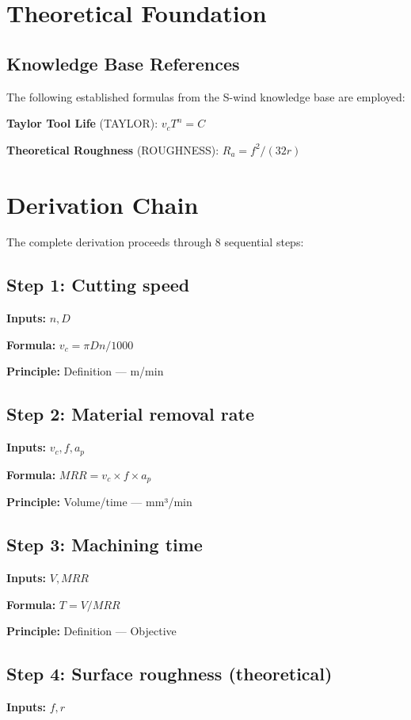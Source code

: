 \documentclass[11pt,twocolumn]{article}
\begin{document}
\section{Theoretical Foundation}

\subsection{Knowledge Base References}
The following established formulas from the S-wind knowledge base are employed:

\textbf{Taylor Tool Life} (TAYLOR): $v_c T^n = C$ \cite{Taylor}

\textbf{Theoretical Roughness} (ROUGHNESS): $R_a = f^2/(32r)$ \cite{Machining Theory}


\section{Derivation Chain}

The complete derivation proceeds through 8 sequential steps:

\subsection*{Step 1: Cutting speed}
\textbf{Inputs:} $n, D$

\textbf{Formula:} $v_c = \pi D n / 1000$

\textbf{Principle:} Definition --- m/min

\subsection*{Step 2: Material removal rate}
\textbf{Inputs:} $v_c, f, a_p$

\textbf{Formula:} $MRR = v_c \times f \times a_p$

\textbf{Principle:} Volume/time --- mm³/min

\subsection*{Step 3: Machining time}
\textbf{Inputs:} $V, MRR$

\textbf{Formula:} $T = V / MRR$

\textbf{Principle:} Definition --- Objective

\subsection*{Step 4: Surface roughness (theoretical)}
\textbf{Inputs:} $f, r$
\end{document}
